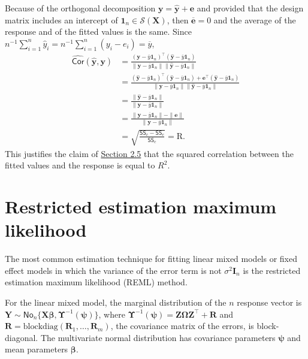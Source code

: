 \documentclass[
  11pt,
  letterpaper,
]{book}
\theoremstyle{definition}
\theoremstyle{definition}
\theoremstyle{definition}
\theoremstyle{remark}
\begin{document}
Because of the orthogonal decomposition \(\boldsymbol{y}=\widehat{\boldsymbol{y}} + \boldsymbol{e}\) and provided that the design matrix includes an intercept of \(\mathbf{1}_n \in \mathcal{S}(\mathbf{X})\), then \(\overline{\boldsymbol{e}}=0\) and the average of the response and of the fitted values is the same. Since \(n^{-1}\sum_{i=1}^n \widehat{y}_i = n^{-1}\sum_{i=1}^n ({y}_i-e_i)=\overline{y}\),
\begin{align*}
\widehat{\mathsf{Cor}}\left(\widehat{\boldsymbol{y}}, \boldsymbol{y}\right)
&= \frac{(\boldsymbol{y} - \overline{y}\mathbf{1}_n)^\top(\widehat{\boldsymbol{y}} - \overline{y}\mathbf{1}_n)}
{\|\boldsymbol{y} - \overline{y}\mathbf{1}_n\|\|\widehat{\boldsymbol{y}} - \overline{y}\mathbf{1}_n\|}
\\&= \frac{(\widehat{\boldsymbol{y}} - \overline{y}\mathbf{1}_n)^\top(\widehat{\boldsymbol{y}} - \overline{y}\mathbf{1}_n) +
\boldsymbol{e}^\top(\widehat{\boldsymbol{y}} - \overline{y}\mathbf{1}_n)}
{\|\boldsymbol{y} - \overline{y}\mathbf{1}_n\|\|\widehat{\boldsymbol{y}} - \overline{y}\mathbf{1}_n\|}
\\&= \frac{\|\widehat{\boldsymbol{y}} - \overline{y}\mathbf{1}_n\|}
{\|\boldsymbol{y} - \overline{y}\mathbf{1}_n\|}
\\&= \frac{\|\boldsymbol{y} - \overline{y}\mathbf{1}_n\| - \|\boldsymbol{e}\|}
{\|\boldsymbol{y} - \overline{y}\mathbf{1}_n\|}
\\&= \sqrt{\frac{\mathsf{SS}_c-\mathsf{SS}_e}{\mathsf{SS}_c}}= \mathrm{R}.
\end{align*}
This justifies the claim of \protect\hyperlink{coefR2}{Section 2.5} that the squared correlation between the fitted values and the response is equal to \(R^2\).

\hypertarget{restricted-estimation-maximum-likelihood}{%
\section{Restricted estimation maximum likelihood}\label{restricted-estimation-maximum-likelihood}}

The most common estimation technique for fitting linear mixed models or fixed effect models in which the variance of the error term is not \(\sigma^2\mathbf{I}_n\) is the restricted estimation maximum likelihood (REML) method.

For the linear mixed model, the marginal distribution of the \(n\) response vector is
\(\boldsymbol{Y} \sim \mathsf{No}_n\{\mathbf{X} \boldsymbol{\beta}, \boldsymbol{\Upsilon}^{-1}(\boldsymbol{\psi})\}\), where \(\boldsymbol{\Upsilon}^{-1}(\boldsymbol{\psi}) = \mathbf{Z}\boldsymbol{\Omega}\mathbf{Z}^\top + \mathbf{R}\) and \(\mathbf{R} = \mathrm{blockdiag}(\mathbf{R}_1, \ldots, \mathbf{R}_m)\), the covariance matrix of the errors, is block-diagonal. The multivariate normal distribution has covariance parameters \(\boldsymbol{\psi}\) and mean parameters \(\boldsymbol{\beta}\).
\end{document}

